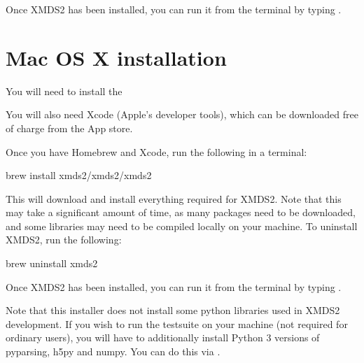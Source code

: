 \documentclass[letterpaper,10pt,english]{sphinxmanual}
\begin{document}
\sphinxAtStartPar
Once XMDS2 has been installed, you can run it from the terminal by typing .

\ignorespaces 

\section{Mac OS X installation}
\label{\detokenize{installation:mac-os-x-installation}}\label{\detokenize{installation:mac-installation}}\label{\detokenize{installation:index-2}}
\sphinxAtStartPar
You will need to install the 

\sphinxAtStartPar
You will also need Xcode (Apple’s developer tools), which can be downloaded free of charge from the App store.

\sphinxAtStartPar
Once you have Homebrew and Xcode, run the following in a terminal:

\begin{sphinxVerbatim}[commandchars=\\\{\}]
brew install xmds2/xmds2/xmds2
\end{sphinxVerbatim}

\sphinxAtStartPar
This will download and install everything required for XMDS2. Note that this may take a significant amount of time, as many packages need to be downloaded, and some libraries may need to be compiled locally on your machine. To uninstall XMDS2, run the following:

\begin{sphinxVerbatim}[commandchars=\\\{\}]
brew uninstall xmds2
\end{sphinxVerbatim}

\sphinxAtStartPar
Once XMDS2 has been installed, you can run it from the terminal by typing .

\sphinxAtStartPar
Note that this installer does not install some python libraries used in XMDS2 development. If you wish to run the testsuite on your machine (not required for ordinary users), you will have to additionally install Python 3 versions of pyparsing, h5py and numpy. You can do this via .

\ignorespaces 
\end{document}
